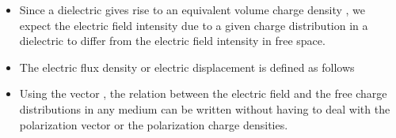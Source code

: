 \begin{ELunit}


\begin{itemize}
\tightlist
\item
  Since a dielectric gives rise to an equivalent volume charge density , we expect the electric field intensity due to a given charge distribution in a dielectric to differ from the electric field intensity in free space.
\end{itemize}


\end{ELunit}

\begin{ELjoin}

\begin{itemize}
\tightlist
\item
  The electric flux density or electric displacement  is defined as follows
\end{itemize}

\begin{ELdefinition}{}


\end{ELdefinition}

\end{ELjoin}

\begin{ELjoin}

\begin{itemize}
\tightlist
\item
  Using the vector , the relation between the electric field and the free charge distributions in any medium can be written without having to deal with the polarization vector  or the polarization charge densities.
\end{itemize}

\begin{ELimportant}{}


\end{ELimportant}

\end{ELjoin}

